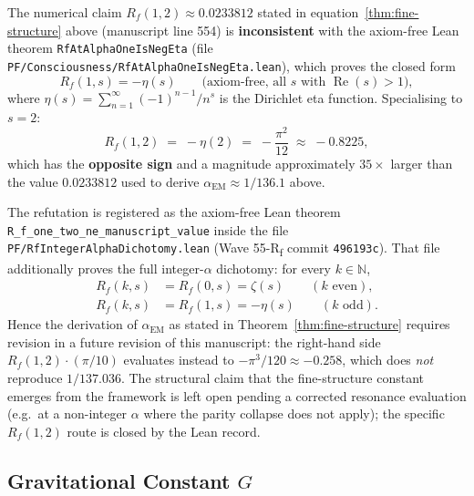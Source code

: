\begin{remark}\label{rem:fine-structure-lean-refutation}
The numerical claim $R_f(1,2) \approx 0.0233812$ stated in equation~\eqref{thm:fine-structure} above (manuscript line 554) is \textbf{inconsistent} with the axiom-free Lean theorem \texttt{RfAtAlphaOneIsNegEta} (file \texttt{PF/Consciousness/RfAtAlphaOneIsNegEta.lean}), which proves the closed form
\begin{equation}
R_f(1, s) = -\eta(s) \qquad \text{(axiom-free, all } s \text{ with } \operatorname{Re}(s) > 1\text{)},
\end{equation}
where $\eta(s) = \sum_{n=1}^\infty (-1)^{n-1}/n^s$ is the Dirichlet eta function. Specialising to $s=2$:
\begin{equation}
R_f(1, 2) \;=\; -\eta(2) \;=\; -\frac{\pi^2}{12} \;\approx\; -0.8225,
\end{equation}
which has the \textbf{opposite sign} and a magnitude approximately $35\times$ larger than the value $0.0233812$ used to derive $\alpha_{\text{EM}} \approx 1/136.1$ above.

The refutation is registered as the axiom-free Lean theorem \texttt{R\_f\_one\_two\_ne\_manuscript\_value} inside the file \texttt{PF/RfIntegerAlphaDichotomy.lean} (Wave 55-R\textsubscript{f} commit \texttt{496193c}). That file additionally proves the full integer-$\alpha$ dichotomy: for every $k \in \mathbb{N}$,
\begin{align}
R_f(k, s) &= R_f(0, s) = \zeta(s) \qquad (k \text{ even}), \\
R_f(k, s) &= R_f(1, s) = -\eta(s) \qquad (k \text{ odd}).
\end{align}
Hence the derivation of $\alpha_{\text{EM}}$ as stated in Theorem~\ref{thm:fine-structure} requires revision in a future revision of this manuscript: the right-hand side $R_f(1,2) \cdot (\pi/10)$ evaluates instead to $-\pi^3/120 \approx -0.258$, which does \emph{not} reproduce $1/137.036$. The structural claim that the fine-structure constant emerges from the framework is left open pending a corrected resonance evaluation (e.g.\ at a non-integer $\alpha$ where the parity collapse does not apply); the specific $R_f(1,2)$ route is closed by the Lean record.
\end{remark}

\subsection{Gravitational Constant $G$}

